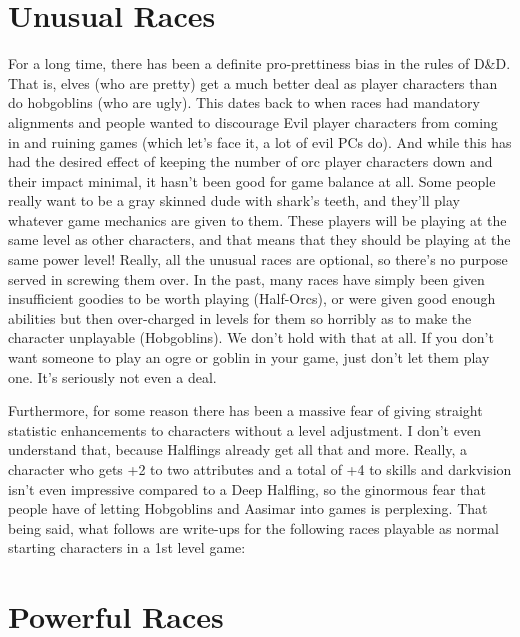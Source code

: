 
\section{Unusual Races}

For a long time, there has been a definite pro-prettiness bias in the rules of D\&D. That is, elves (who are pretty) get a much better deal as player characters than do hobgoblins (who are ugly). This dates back to when races had mandatory alignments and people wanted to discourage Evil player characters from coming in and ruining games (which let's face it, a lot of evil PCs do). And while this has had the desired effect of keeping the number of orc player characters down and their impact minimal, it hasn't been good for game balance at all. Some people really want to be a gray skinned dude with shark's teeth, and they'll play whatever game mechanics are given to them. These players will be playing at the same level as other characters, and that means that they should be playing at the same power level! Really, all the unusual races are optional, so there's no purpose served in screwing them over. In the past, many races have simply been given insufficient goodies to be worth playing (Half-Orcs), or were given good enough abilities but then over-charged in levels for them so horribly as to make the character unplayable (Hobgoblins). We don't hold with that at all. If you don't want someone to play an ogre or goblin in your game, just don't let them play one. It's seriously not even a deal.

Furthermore, for some reason there has been a massive fear of giving straight statistic enhancements to characters without a level adjustment. I don't even understand that, because Halflings already get all that and more. Really, a character who gets +2 to two attributes and a total of +4 to skills and darkvision isn't even impressive compared to a Deep Halfling, so the ginormous fear that people have of letting Hobgoblins and Aasimar into games is perplexing. That being said, what follows are write-ups for the following races playable as normal starting characters in a 1st level game:

















\section{Powerful Races}

